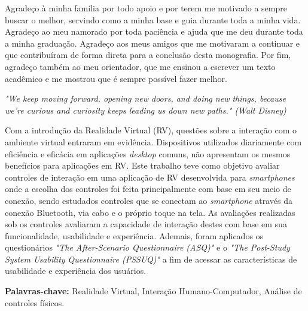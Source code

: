 \documentclass[
	12pt,				%
	openright,			%
	oneside,			%
	a4paper,			%
	english,			%
	french,				%
	spanish,			%
	brazil				%
	]{abntex2}
\begin{document}

\begin{agradecimentos}
Agradeço à minha família por todo apoio e por terem me motivado a sempre buscar o melhor, servindo como a minha base e guia durante toda a minha vida. Agradeço ao meu namorado por toda paciência e ajuda que me deu durante toda a minha graduação. Agradeço aos meus amigos que me motivaram a continuar e que contribuíram de forma direta para a conclusão desta monografia. Por fim, agradeço também ao meu orientador, que me ensinou a escrever um texto acadêmico e me mostrou que é sempre possível fazer melhor.
\end{agradecimentos}

\begin{epigrafe}
    \vspace*{\fill}
	\begin{flushright}
		\textit{"We keep moving forward, opening new doors, and doing new things, because we're curious and curiosity keeps leading us down new paths." (Walt Disney)}
	\end{flushright}
\end{epigrafe}


\setlength{\absparsep}{18pt} %
\begin{resumo}

Com a introdução da Realidade Virtual (RV), questões sobre a interação com o ambiente virtual entraram em evidência. Dispositivos utilizados diariamente com eficiência e eficácia em aplicações \textit{desktop} comuns, não apresentam os mesmos benefícios para aplicações em RV. 
Este trabalho teve como objetivo avaliar controles de interação em uma aplicação de RV desenvolvida para \textit{smartphones} onde a escolha dos controles foi feita principalmente com base em seu meio de conexão, sendo estudados controles que se conectam ao \textit{smartphone} através da conexão Bluetooth, via cabo e o próprio toque na tela. 
As avaliações realizadas sob os controles avaliaram a capacidade de interação destes com base em sua funcionalidade, usabilidade e experiência. Ademais, foram aplicados os questionários \textit{"The After-Scenario Questionnaire (ASQ)"} e o \textit{"The Post-Study System Usability Questionnaire (PSSUQ)"} a fim de acessar as características de usabilidade e experiência dos usuários. 

\textbf{Palavras-chave:} Realidade Virtual, Interação Humano-Computador, Análise de controles físicos.
\end{resumo}
\end{document}
